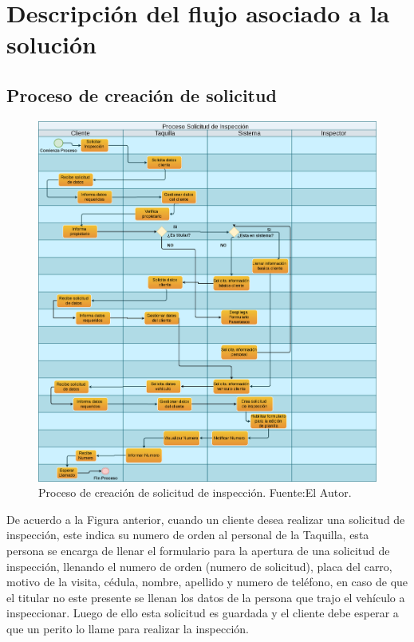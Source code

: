 \setlength{\parskip}{0mm}


\section{Descripción del flujo asociado a la solución} 
\setlength{\parskip}{5mm}
\setlength{\parskip}{0mm}

\subsection{Proceso de creación de solicitud}
\setlength{\parskip}{5mm}

\begin{figure}[H]
\begin{center}
	\includegraphics[width=\textwidth]{img/diagramas/proceso_creacion_solicitud_inspeccion.png}
\end{center}
\caption{Proceso de creación de solicitud de inspección. Fuente:El Autor.}
\label{fig:proceso_creacion_solicitud_inspeccion}
\end{figure}

De acuerdo a la Figura anterior, cuando un cliente desea realizar una solicitud de inspección, este indica su numero de orden al personal de la Taquilla, esta persona se encarga de llenar el formulario para la apertura de una solicitud de inspección, llenando el numero de orden (numero de solicitud), placa del carro, motivo de la visita, cédula, nombre, apellido y numero de teléfono, en caso de que el titular no este presente se llenan los datos de la persona que trajo el vehículo a inspeccionar. Luego de ello esta solicitud es guardada y el cliente debe esperar a que un perito lo llame para realizar la inspección.

